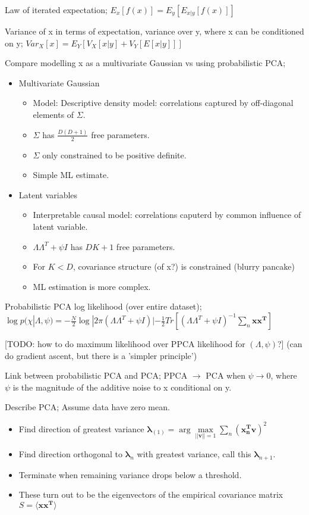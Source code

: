 \documentclass{article}
\begin{document}
Law of iterated expectation; $E_x[f(x)] = E_y[E_{x|y}[f(x)]]$

Variance of x in terms of expectation, variance over y, where x can be conditioned on y; $Var_X[x] = E_Y[V_X[x|y] + V_Y[E[x|y]]]$

Compare modelling x as a multivariate Gaussian vs using probabilistic PCA; \begin{itemize}\item Multivariate Gaussian
	\begin{itemize}
		\item Model: Descriptive density model: correlations captured by off-diagonal elements of $\Sigma$.
		\item $\Sigma$ has $\frac{D(D+1)}{2}$ free parameters.
		\item $\Sigma$ only constrained to be positive definite.
		\item Simple ML estimate.
	\end{itemize}
	\item Latent variables
	\begin{itemize}
		\item Interpretable causal model: correlations caputerd by common influence of latent variable.
		\item $\Lambda\Lambda^T +\psi I$ has $DK+1$ free parameters.
		\item For $K < D$, covariance structure (of x?) is constrained (blurry pancake)
		\item ML estimation is more complex.
	\end{itemize}
\end{itemize}

Probabilistic PCA log likelihood (over entire dataset); $\log p(\chi | \Lambda, \psi) = -\frac{N}{2}\log|2\pi(\Lambda\Lambda^T+\psi I)|-\frac{1}{2}Tr[(\Lambda\Lambda^T+\psi I)^{-1}\sum_n\mathbf{x x^T}]$

[TODO: how to do maximum likelihood over PPCA likelihood for $(\Lambda, \psi)$?] (can do gradient ascent, but there is a 'simpler principle')

Link between probabilistic PCA and PCA; PPCA $\to$ PCA when $\psi\to 0$, where $\psi$ is the magnitude of the additive noise to x conditional on y.

Describe PCA; Assume data have zero mean. \begin{itemize}
	\item Find direction of greatest variance $\mathbf{\lambda}_{(1)}=\arg\max\limits_{||\mathbf{v}||=1}\sum_n(\mathbf{x^T_nv})^2$ 
	\item Find direction orthogonal to $\mathbf{\lambda}_{n}$ with greatest variance, call this  $\mathbf{\lambda}_{n+1}$.
	\item Terminate when remaining variance drops below a threshold.
	\item These turn out to be the eigenvectors of the empirical covariance matrix $S=\langle \mathbf{xx^T} \rangle$
\end{itemize}
\end{document}
